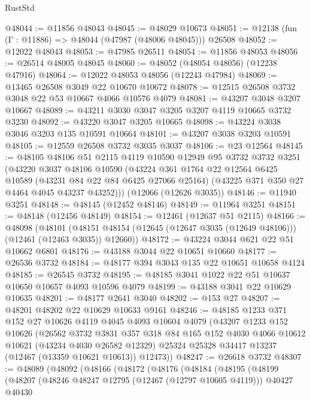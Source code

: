 \begin{lexlean}{RustStd}
\begin{coremodule}
@48044 := @11856 @48043
@48045 := @48029 @10673
@48051 := @12138 (fun (Γ : @11886) => @48044 (@47987 (@48006 @48045))) @26508
@48052 := @12022 @48043
@48053 := @47985 @26511
@48054 := @11856 @48053
@48056 := @26514 @48005 @48045
@48060 := @48052 (@48054 @48056) (@12238 @47916)
@48064 := @12022 @48053 @48056 (@12243 @47984)
@48069 := @13465 @26508 @3049 @22 @10670 @10672
@48078 := @12515 @26508 @3732 @3048 @22 @53 @10667 @4066 @10576 @4079
@48081 := @43207 @3048 @3207 @10667
@48089 := @43211 @3030 @3047 @3205 @3207 @4119 @10665 @3732 @3230
@48092 := @43220 @3047 @3205 @10665
@48098 := @43224 @3038 @3046 @3203 @135 @10591 @10664
@48101 := @43207 @3038 @3203 @10591
@48105 := @12559 @26508 @3732 @3035 @3037
@48106 := @23 @12564
@48145 := @48105
    @48106
    @51
    @2115
    @4119
    @10590
    @12949
    @95
    @3732
    @3732
    @3251
    (@43220
      @3037
      @48106
      @10590
      (@43224
        @361
        @1764
        @22
        @12564
        @6425
        @10589
        (@43231 @84 @22 @84 @6425 @27066 @25164)
        (@43225 @371 @350 @27 @4464 @4045 @43237 @43252)))
    (@12066 (@12626 @3035))
@48146 := @11940 @3251
@48148 := @48145 (@12452 @48146)
@48149 := @11964 @3251
@48151 := @48148 (@12456 @48149)
@48154 := @12461 (@12637 @51 @2115)
@48166 := @48098
    (@48101 (@48151 @48154 (@12645 (@12647 @3035 (@12649 @48106))) (@12461 (@12463 @3035)) @12660))
@48172 := @43224 @3044 @621 @22 @51 @10662 @6801
@48176 := @43188 @3044 @22 @10651 @10660
@48177 := @26536 @3732
@48184 := @48177 @394 @3043 @135 @22 @10651 @10658 @4124
@48185 := @26545 @3732
@48195 := @48185 @3041 @1022 @22 @51 @10637 @10650 @10657 @4093 @10596 @4079
@48199 := @43188 @3041 @22 @10629 @10635
@48201 := @48177 @2641 @3040
@48202 := @153 @27
@48207 := @48201 @48202 @22 @10629 @10633 @9161
@48246 := @48185
    @1233
    @371
    @152
    @27
    @10626
    @4119
    @4045
    @4093
    @10604
    @4079
    (@43207
      @1233
      @152
      @10626
      (@26562
        @3732
        @3831
        @357
        @318
        @84
        @165
        @152
        @4030
        @4066
        @10612
        @10621
        (@43234 @4030 @26582 @12329)
        @25324
        @25328
        @34417
        @13237
        (@12467 (@13359 @10621 @10613))
        @12473))
@48247 := @26618 @3732
@48307 := @48089
    (@48092
      (@48166
        (@48172
          (@48176
            (@48184
              (@48195
                (@48199
                  (@48207
                    (@48246 @48247 @12795 (@12467 (@12797 @10605 @4119)))
                    @40427
                    @40430

\end{coremodule}
\end{lexlean}
